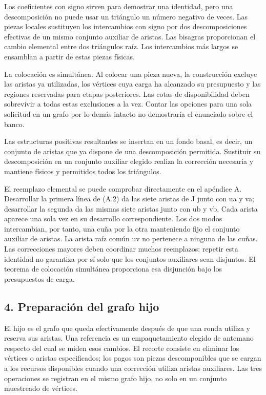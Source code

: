 \documentclass[spanish,11pt,a4paper]{article}
\begin{document}
Los coeficientes con signo sirven para demostrar una identidad, pero una descomposición no puede usar un triángulo un número negativo de veces. Las piezas locales sustituyen los intercambios con signo por dos descomposiciones efectivas de un mismo conjunto auxiliar de aristas. Las bisagras proporcionan el cambio elemental entre dos triángulos raíz. Los intercambios más largos se ensamblan a partir de estas piezas físicas.

La colocación es simultánea. Al colocar una pieza nueva, la construcción excluye las aristas ya utilizadas, los vértices cuya carga ha alcanzado su presupuesto y las regiones reservadas para etapas posteriores. Las cotas de disponibilidad deben sobrevivir a todas estas exclusiones a la vez. Contar las opciones para una sola solicitud en un grafo por lo demás intacto no demostraría el enunciado sobre el banco.

Las estructuras positivas resultantes se insertan en un fondo basal, es decir, un conjunto de aristas que ya dispone de una descomposición permitida. Sustituir su descomposición en un conjunto auxiliar elegido realiza la corrección necesaria y mantiene físicos y permitidos todos los triángulos.

El reemplazo elemental se puede comprobar directamente en el apéndice A. Desarrollar la primera línea de (A.2) da las siete aristas de J junto con ua y va; desarrollar la segunda da las mismas siete aristas junto con ub y vb. Cada arista aparece una sola vez en su desarrollo correspondiente. Los dos modos intercambian, por tanto, una cuña por la otra manteniendo fijo el conjunto auxiliar de aristas. La arista raíz común uv no pertenece a ninguna de las cuñas. Las correcciones mayores deben coordinar muchos reemplazos: repetir esta identidad no garantiza por sí solo que los conjuntos auxiliares sean disjuntos. El teorema de colocación simultánea proporciona esa disjunción bajo los presupuestos de carga.

\subsection{4. Preparación del grafo hijo}\label{preparaciuxf3n-del-grafo-hijo}

El hijo es el grafo que queda efectivamente después de que una ronda utiliza y reserva sus aristas. Una referencia es un empaquetamiento elegido de antemano respecto del cual se miden esos cambios. El recorte consiste en eliminar los vértices o aristas especificados; los pagos son piezas descomponibles que se cargan a los recursos disponibles cuando una corrección utiliza aristas auxiliares. Las tres operaciones se registran en el mismo grafo hijo, no solo en un conjunto muestreado de vértices.
\end{document}
